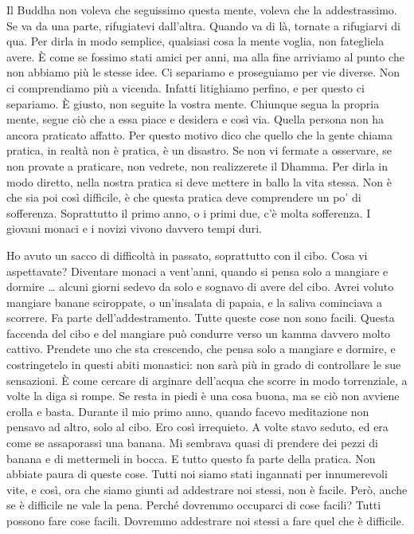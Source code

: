 Il Buddha non voleva che seguissimo questa mente, voleva che la
addestrassimo. Se va da una parte, rifugiatevi dall'altra. Quando va di
là, tornate a rifugiarvi di qua. Per dirla in modo semplice, qualsiasi
cosa la mente voglia, non fategliela avere. È come se fossimo stati
amici per anni, ma alla fine arriviamo al punto che non abbiamo più le
stesse idee. Ci separiamo e proseguiamo per vie diverse. Non ci
comprendiamo più a vicenda. Infatti litighiamo perfino, e per questo ci
separiamo. È giusto, non seguite la vostra mente. Chiunque segua la
propria mente, segue ciò che a essa piace e desidera e così via. Quella
persona non ha ancora praticato affatto. Per questo motivo dico che
quello che la gente chiama pratica, in realtà non è pratica, è un
disastro. Se non vi fermate a osservare, se non provate a praticare, non
vedrete, non realizzerete il Dhamma. Per dirla in modo diretto, nella
nostra pratica si deve mettere in ballo la vita stessa. Non è che sia
poi così difficile, è che questa pratica deve comprendere un po' di
sofferenza. Soprattutto il primo anno, o i primi due, c'è molta
sofferenza. I giovani monaci e i novizi vivono davvero tempi duri.

Ho avuto un sacco di difficoltà in passato, soprattutto con il cibo.
Cosa vi aspettavate? Diventare monaci a vent'anni, quando si pensa solo
a mangiare e dormire \ldots{} alcuni giorni sedevo da solo e sognavo di avere
del cibo. Avrei voluto mangiare banane sciroppate, o un'insalata di
papaia, e la saliva cominciava a scorrere. Fa parte dell'addestramento.
Tutte queste cose non sono facili. Questa faccenda del cibo e del
mangiare può condurre verso un kamma davvero molto cattivo.
Prendete uno che sta crescendo, che pensa solo a mangiare e dormire, e
costringetelo in questi abiti monastici: non sarà più in grado di
controllare le sue sensazioni. È come cercare di arginare dell'acqua che
scorre in modo torrenziale, a volte la diga si rompe. Se resta in piedi
è una cosa buona, ma se ciò non avviene crolla e basta. Durante il mio
primo anno, quando facevo meditazione non pensavo ad altro, solo al
cibo. Ero così irrequieto. A volte stavo seduto, ed era come se
assaporassi una banana. Mi sembrava quasi di prendere dei pezzi di
banana e di mettermeli in bocca. E tutto questo fa parte della pratica.
Non abbiate paura di queste cose. Tutti noi siamo stati ingannati per
innumerevoli vite, e così, ora che siamo giunti ad addestrare noi
stessi, non è facile. Però, anche se è difficile ne vale la pena. Perché
dovremmo occuparci di cose facili? Tutti possono fare cose facili.
Dovremmo addestrare noi stessi a fare quel che è difficile.

